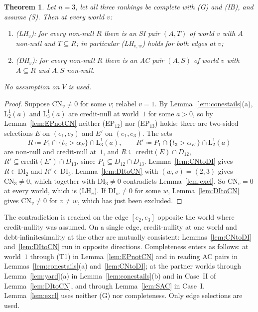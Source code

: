 \documentclass[11pt]{article}
\newtheorem{theorem}{Theorem}
\theoremstyle{definition}\newtheorem{definition}[theorem]{Definition}
\theoremstyle{remark}\newtheorem{remark}[theorem]{Remark}
\newcommand{\cred}{\mathrm{credit}}
\newcommand{\Lo}[3]{\mathrm L^{#1}_{#2}(#3)}
\newcommand{\CN}{\mathrm{CN}}
\newcommand{\DI}{\mathrm{DI}}
\begin{document}
\begin{theorem}\label{thm:LH}
Let $n=3$, let all three rankings be complete with (G) and (IB), and assume
(S). Then at every world $v$:
\begin{enumerate}[label=(\roman*)]
\item (LH$_v$): for every non-null $R$ there is an SI pair $(A,T)$ of world
$v$ with $A$ non-null and $T\subseteq R$; in particular (LH$_{v,w}$) holds
for both edges at $v$;
\item (DH$_v$): for every non-null $R$ there is an AC pair $(A,S)$ of world
$v$ with $A\subseteq R$ and $A,S$ non-null.
\end{enumerate}
No assumption on $V$ is used.
\end{theorem}
\begin{proof}
Suppose $\CN_v\ne0$ for some $v$; relabel $v=1$. By
Lemma~\ref{lem:conestails}(a), $\Lo12a$ and $\Lo13a$ are credit-null at
world~$1$ for some $a>0$, so by Lemma~\ref{lem:EPnotCN} neither (EP$_{12}$)
nor (EP$_{13}$) holds: there are two-sided selections $E$ on $(e_1,e_2)$ and
$E'$ on $(e_1,e_3)$. The sets
\[
 R\coloneqq P_1\cap\{t_2>\alpha_E\}\cap\Lo13a,\qquad
 R'\coloneqq P_1\cap\{t_3>\alpha_{E'}\}\cap\Lo12a
\]
are non-null and credit-null at~$1$, and $R\subseteq\cred(E)\cap D_{12}$,
$R'\subseteq\cred(E')\cap D_{13}$, since $P_1\subseteq D_{12}\cap D_{13}$.
Lemma~\ref{lem:CNtoDI} gives $R\in\DI_2$ and $R'\in\DI_3$. Lemma~\ref{lem:DItoCN}
with $(w,v)=(2,3)$ gives $\CN_3\ne0$, which together with $\DI_3\ne0$
contradicts Lemma~\ref{lem:excl}. So $\CN_v=0$ at every world, which is
(LH$_v$). If $\DI_w\ne0$ for some $w$, Lemma~\ref{lem:DItoCN} gives
$\CN_v\ne0$ for $v\ne w$, which has just been excluded.
\end{proof}

The contradiction is reached on the edge $[e_2,e_3]$ opposite the world
where credit-nullity was assumed. On a single edge, credit-nullity at one
world and debt-infinitesimality at the other are mutually consistent:
Lemmas~\ref{lem:CNtoDI} and~\ref{lem:DItoCN} run in opposite directions.
Completeness enters as follows: at world~$1$ through (T1) in
Lemma~\ref{lem:EPnotCN} and in reading AC pairs in
Lemmas~\ref{lem:conestails}(a) and~\ref{lem:CNtoDI}; at the partner worlds
through Lemma~\ref{lem:yard}(a) in Lemma~\ref{lem:conestails}(b) and in
Case~II of Lemma~\ref{lem:DItoCN}, and through Lemma~\ref{lem:SAC} in Case~I.
Lemma~\ref{lem:excl} uses neither (G) nor completeness. Only edge selections
are used.
\end{document}
